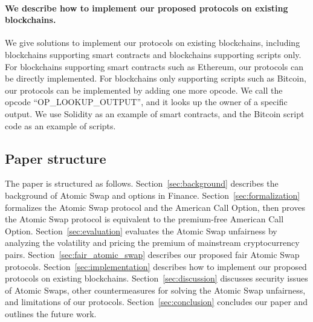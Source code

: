 \paragraph{We describe how to implement our proposed protocols on existing blockchains.}
We give solutions to implement our protocols on existing blockchains, including blockchains supporting smart contracts and blockchains supporting scripts only.
For blockchains supporting smart contracts such as Ethereum, our protocols can be directly implemented.
For blockchains only supporting scripts such as Bitcoin, our protocols can be implemented by adding one more opcode.
We call the opcode ``OP\_LOOKUP\_OUTPUT'', and it looks up the owner of a specific output.
We use Solidity as an example of smart contracts, and the Bitcoin script code as an example of scripts.

\subsection{Paper structure}

The paper is structured as follows.
Section~\ref{sec:background} describes the background of Atomic Swap and options in Finance.
Section~\ref{sec:formalization} formalizes the Atomic Swap protocol and the American Call Option, then proves the Atomic Swap protocol is equivalent to the premium-free American Call Option.
Section~\ref{sec:evaluation} evaluates the Atomic Swap unfairness by analyzing the volatility and pricing the premium of mainstream cryptocurrency pairs.
Section~\ref{sec:fair_atomic_swap} describes our proposed fair Atomic Swap protocols.
Section~\ref{sec:implementation} describes how to implement our proposed protocols on existing blockchains.
Section~\ref{sec:discussion} discusses security issues of Atomic Swaps, other countermeasures for solving the Atomic Swap unfairness, and limitations of our protocols.
Section~\ref{sec:conclusion} concludes our paper and outlines the future work.